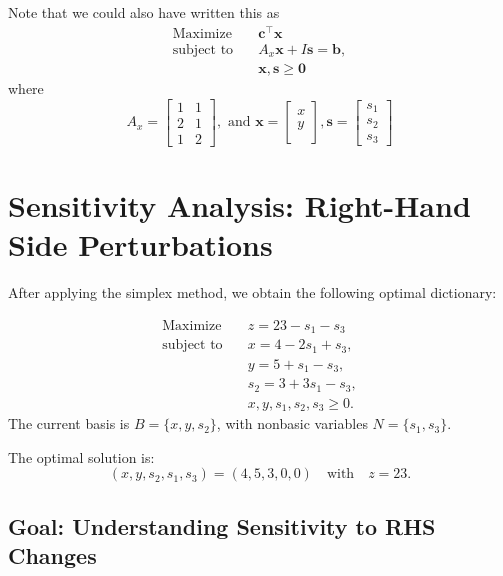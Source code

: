 Note that we could also have written this as 
\[
\begin{aligned}
\text{Maximize} \quad & \mathbf{c}^\top \mathbf{x} \\
\text{subject to} \quad & A_x\mathbf{x} + I\mathbf{s}  = \mathbf{b}, \\
& \mathbf{x}, \mathbf{s} \geq \mathbf{0}
\end{aligned}
\]
where 
\[
A_x =
\begin{bmatrix}
1 & 1 \\
2 & 1 \\
1 & 2 
\end{bmatrix},
\text{ and }
\mathbf{x} = 
\begin{bmatrix}
x \\
y \\
\end{bmatrix},
\mathbf{s} = 
\begin{bmatrix}
s_1 \\
s_2 \\
s_3
\end{bmatrix}\]



\section{Sensitivity Analysis: Right-Hand Side Perturbations}

After applying the simplex method, we obtain the following optimal dictionary:

\begin{tcolorbox}[colback=green!5!white, colframe=green!75!black,    
    width=1\textwidth,
    box align=center, 
    title=\textbf{Final Dictionary}]
\[
\begin{aligned}
\text{Maximize} \quad 
& z = 23 - s_1 - s_3 \\
\text{subject to} \quad 
& x = 4 - 2s_1 + s_3, \\
& y = 5 + s_1 - s_3, \\
& s_2 = 3 + 3s_1 - s_3, \\
& x, y, s_1, s_2, s_3 \geq 0.
\end{aligned}
\]
The current basis is \( B = \{x, y, s_2\} \), with nonbasic variables \( N = \{s_1, s_3\} \).

The optimal solution is:
\[
(x, y, s_2, s_1, s_3) = (4, 5, 3, 0, 0) \quad \text{with} \quad z = 23.
\]
\end{tcolorbox}

\subsection*{Goal: Understanding Sensitivity to RHS Changes}

